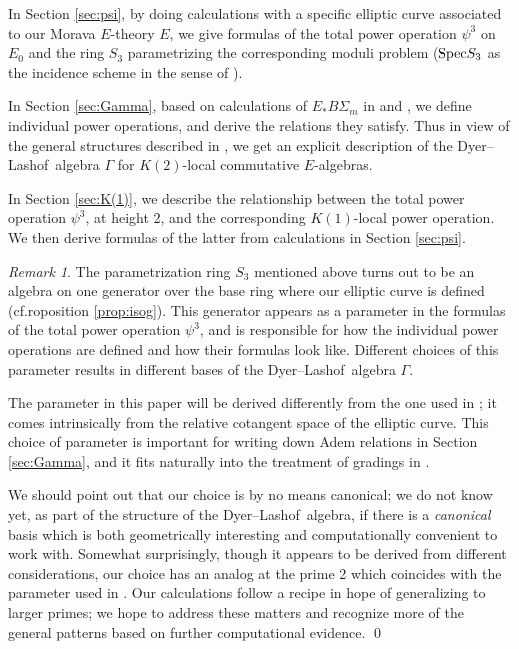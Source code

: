 \documentclass{gtpart}
\theoremstyle{definition}
\theoremstyle{remark}
\newtheorem{rmk}[thm]{Remark}
\newcommand{\Spec}{{\rm Spec}}
\newcommand{\DL}{Dyer--Lashof~}
\newcommand{\p}{\psi^3}
\newcommand{\G}{\Gamma}
\begin{document}
In Section \ref{sec:psi}, by doing calculations with a specific elliptic curve associated to our Morava $E$-theory $E$, 
we give formulas of the total power operation $\p$ on $E_0$ and the ring $S_3$ parametrizing the corresponding moduli problem 
($\Spec S_3$ as the incidence scheme in the sense of \cite{katzmazur}).  

In Section \ref{sec:Gamma}, based on calculations of $E_* B\Sigma_m$ in \cite{ST} and \cite{Str98}, 
we define individual power operations, and derive the relations they satisfy.  
Thus in view of the general structures described in \cite{cong}, 
we get an explicit description of the \DL algebra $\G$ for $K(2)$-local commutative $E$-algebras.  

In Section \ref{sec:K(1)}, we describe the relationship between the total power operation $\p$, at height 2, and the corresponding $K(1)$-local power operation.  
We then derive formulas of the latter from calculations in Section \ref{sec:psi}.  

\begin{rmk}
 The parametrization ring $S_3$ mentioned above turns out to be an algebra on one generator over the base ring where our elliptic curve is defined 
 (cf.roposition \ref{prop:isog}).  This generator appears as a parameter in the formulas of the total power operation $\p$, 
 and is responsible for how the individual power operations are defined and how their formulas look like.  
 Different choices of this parameter results in different bases of the \DL algebra $\G$.  

 The parameter in this paper will be derived differently from the one used in \cite{h2p2}; 
 it comes intrinsically from the relative cotangent space of the elliptic curve.  
 This choice of parameter is important for writing down Adem relations in Section \ref{sec:Gamma}, 
 and it fits naturally into the treatment of gradings in \cite{cong}.  

 We should point out that our choice is by no means canonical; 
 we do not know yet, as part of the structure of the \DL algebra, 
 if there is a {\em canonical} basis which is both geometrically interesting and computationally convenient to work with.  
 Somewhat surprisingly, though it appears to be derived from different considerations, 
 our choice has an analog at the prime 2 which coincides with the parameter used in \cite{h2p2}.  
 Our calculations follow a recipe in hope of generalizing to larger primes; 
 we hope to address these matters and recognize more of the general patterns based on further computational evidence.  
\qed
\end{rmk}
\end{document}
